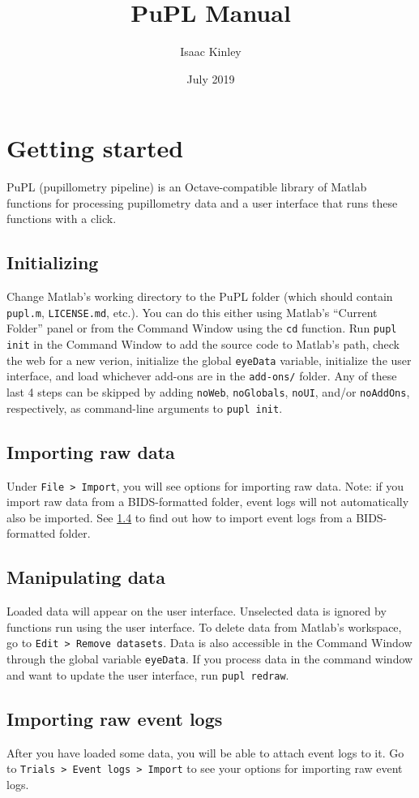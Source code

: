 \documentclass{article}
\title{PuPL Manual}
\author{Isaac Kinley}
\date{July 2019}
\begin{document}
\maketitle
\tableofcontents

\section{Getting started}
PuPL (pupillometry pipeline) is an Octave-compatible library of Matlab functions for processing pupillometry data and a user interface that runs these functions with a click.

\subsection{Initializing}
Change Matlab's working directory to the PuPL folder (which should contain \texttt{pupl.m}, \texttt{LICENSE.md}, etc.). You can do this either using Matlab's ``Current Folder'' panel or from the Command Window using the \texttt{cd} function. Run \texttt{pupl init} in the Command Window to add the source code to Matlab's path, check the web for a new verion, initialize the global \texttt{eyeData} variable, initialize the user interface, and load whichever add-ons are in the \texttt{add-ons/} folder. Any of these last 4 steps can be skipped by adding \texttt{noWeb}, \texttt{noGlobals}, \texttt{noUI}, and/or \texttt{noAddOns}, respectively, as command-line arguments to \texttt{pupl init}.
\subsection{Importing raw data}
Under \texttt{File > Import}, you will see options for importing raw data. Note: if you import raw data from a BIDS-formatted folder, event logs will not automatically also be imported. See \ref{import_event_logs} to find out how to import event logs from a BIDS-formatted folder.
\subsection{Manipulating data}
Loaded data will appear on the user interface. Unselected data is ignored by functions run using the user interface. To delete data from Matlab's workspace, go to \texttt{Edit > Remove datasets}. Data is also accessible in the Command Window through the global variable \texttt{eyeData}. If you process data in the command window and want to update the user interface, run \texttt{pupl redraw}.
\subsection{Importing raw event logs} \label{import_event_logs}
After you have loaded some data, you will be able to attach event logs to it. Go to \texttt{Trials > Event logs > Import} to see your options for importing raw event logs.
\end{document}
